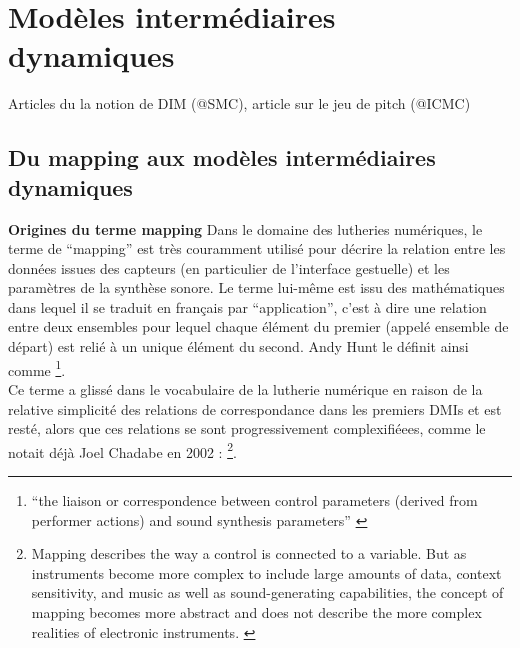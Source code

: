 
\section{Modèles intermédiaires dynamiques}
\label{sec:algorithms:MID}
Articles du la notion de DIM (@SMC), article sur le jeu de pitch (@ICMC)


\subsection{Du mapping aux modèles intermédiaires dynamiques}

\par{\textbf{Origines du terme mapping}} Dans le domaine des lutheries numériques, le terme de ``mapping'' est très couramment utilisé pour décrire la relation entre les données issues des capteurs (en particulier de l'interface gestuelle) et les paramètres de la synthèse sonore. Le terme lui-même est issu des mathématiques dans lequel il se traduit en français par ``application'', c'est à dire une relation entre deux ensembles pour lequel chaque élément du premier (appelé ensemble de départ) est relié à un unique élément du second. Andy Hunt le définit ainsi comme \footnote{``the liaison or correspondence between control parameters (derived from performer actions) and sound synthesis parameters'' \cite{hunt_towards_2000}}.\\
\indent Ce terme a glissé dans le vocabulaire de la lutherie numérique en raison de la relative simplicité des relations de correspondance dans les premiers \glspl{DMI} et est resté, alors que ces relations se sont progressivement complexifiéees, comme le notait déjà Joel Chadabe en 2002 : \footnote{Mapping describes the way a control is connected to a variable. But as instruments become more complex to include large amounts of data, context sensitivity, and music as well as sound-generating capabilities, the concept of mapping becomes more abstract and does not describe the more complex realities of electronic instruments. \cite{chadabe_limitations_2002}}.\\

